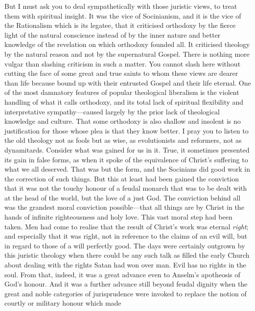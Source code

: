 \documentclass[draft]{ptfdoc}
\begin{document}
But I must ask you to deal sympathetically 
with those juristic views, to treat them with 
spiritual insight. It was the vice of Socinianism, 
and it is the vice of the Rationalism which is its 
legatee, that it criticised orthodoxy by the fierce 
light of the natural conscience instead of by the 
inner nature and better knowledge of the revelation 
on which orthodoxy founded all. It criticised 
theology by the natural reason and not by 
the supernatural Gospel. There is nothing more 
vulgar than slashing criticism in such a matter. 
You cannot slash here without cutting the face 
of some great and true saints to whom these 
views are dearer than life because bound up 
with their entrusted Gospel and their life 
eternal. One of the most damnatory features 
of popular theological liberalism is the violent 
handling of what it calls orthodoxy, and its 
total lack of spiritual flexibility and interpretative 
sympathy---caused largely by the prior 
lack of theological knowledge and culture. 
That some orthodoxy is also shallow and insolent 
is no justification for those whose plea 
is that they know better. I pray you to listen 
to the old theology not as fools but as wise, 
as evolutionists and reformers, not as dynamitards. 
Consider what was gained for us in 
it. True, it sometimes presented its gain in 
false forms, as when it spoke of the equivalence 
of Christ's suffering to what we all deserved. 
That was but the form, and the Socinians did good 
work in the correction of such things. But this 
at least had been gained the conviction that it 
was not the touchy honour of a feudal monarch 
that was to be dealt with at the head of the 
world, but the love of a just God. The conviction 
behind all was the grandest moral conviction 
possible---that all things are by Christ in the 
hands of infinite righteousness and holy love. 
This vast moral step had been taken. Men had 
come to realise that the result of Christ's work 
was eternal \textit{right}; and especially that it was 
right, not in reference to the claims of an evil 
will, but in regard to those of a will perfectly 
good. The days were certainly outgrown by this 
juristic theology when there could be any such 
talk as filled the early Church about dealing 
with the rights Satan had won over man. 
Evil has no rights in the soul. From that, indeed, 
it was a great advance even to Anselm's 
apotheosis of God's honour. And it was a 
further advance still beyond feudal dignity 
when the great and noble categories of jurisprudence 
were invoked to replace the notion 
of courtly or military honour which made 
\end{document}
